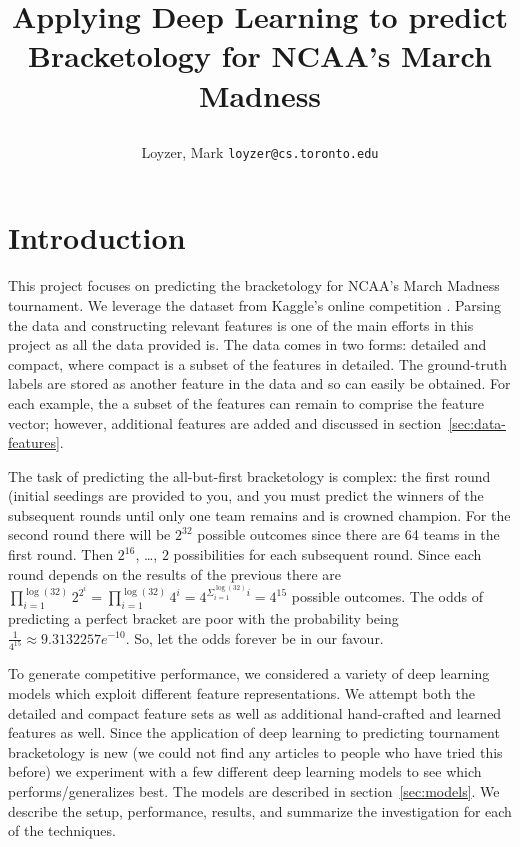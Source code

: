 \documentclass{article} %
\begin{document}
\title{Applying Deep Learning to predict Bracketology for NCAA's March Madness
\author{Loyzer, Mark \texttt{loyzer@cs.toronto.edu}}
}





\newcommand{\fix}{\marginpar{FIX}}
\newcommand{\new}{\marginpar{NEW}}


\maketitle

\section{Introduction}
This project focuses on predicting the bracketology for NCAA's March Madness tournament.
We leverage the dataset from Kaggle's online competition \citep{kagglecompetition}.
Parsing the data and constructing relevant features is one of the main efforts in this project as all the data provided is.
The data comes in two forms: detailed and compact, where compact is a subset of the features in detailed.
The ground-truth labels are stored as another feature in the data and so can easily be obtained.
For each example, the a subset of the features can remain to comprise the feature vector; however, additional features are added and discussed in section~\ref{sec:data-features}.


The task of predicting the all-but-first bracketology is complex: the first round (initial seedings are provided to you, and you must predict the winners of the subsequent rounds until only one team remains and is crowned champion.
For the second round there will be $2^{32}$ possible outcomes since there are 64 teams in the first round.
Then $2^{16}$, \dots, $2$ possibilities for each subsequent round.
Since each round depends on the results of the previous there are $\prod_{i=1}^{\log(32)} 2^{2^{i}} = \prod_{i=1}^{\log(32)} 4^{i} = 4^{\Sigma_{i=1}^{\log(32)} i} = 4^{15}$ possible outcomes.
 The odds of predicting a perfect bracket are poor with the probability being $\frac{1}{4^{15}} \approx 9.3132257e^{-10}$.
So, let the odds forever be in our favour.


To generate competitive performance, we considered a variety of deep learning models which exploit different feature representations.
We attempt both the detailed and compact feature sets as well as additional hand-crafted and learned features as well.
Since the application of deep learning to predicting tournament bracketology is new (we could not find any articles to people who have tried this before) we experiment with a few different deep learning models to see which performs/generalizes best.
The models are described in section~\ref{sec:models}.
We describe the setup, performance, results, and summarize the investigation for each of the techniques.
\end{document}
